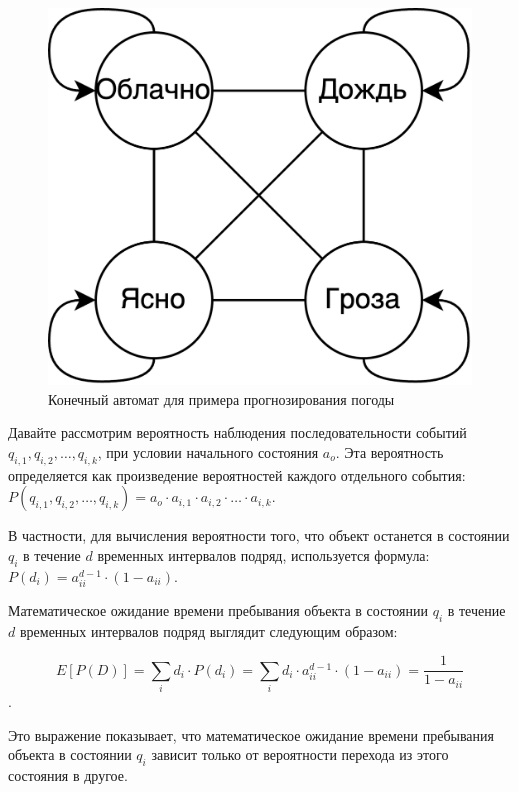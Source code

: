 \begin{figure}[H]
	\begin{center}
		\includegraphics[width=0.40\linewidth]{src/img/1/pogoda_state_machine.png}
		\caption{Конечный автомат для примера прогнозирования погоды}
		\label{fig:pogoda_state_machine}
	\end{center}
\end{figure}

Давайте рассмотрим вероятность наблюдения последовательности событий $q_{i,1}, q_{i,2}, \ldots, q_{i,k}$, при условии начального состояния $a_o$. Эта вероятность определяется как произведение вероятностей каждого отдельного события: $P(q_{i,1}, q_{i,2}, \ldots, q_{i,k}) = a_o \cdot a_{i,1} \cdot a_{i,2} \cdot \ldots \cdot a_{i,k}$.

В частности, для вычисления вероятности того, что объект останется в состоянии $q_i$ в течение $d$ временных интервалов подряд, используется формула: $P(d_i) = a_{ii}^{d-1} \cdot (1 - a_{ii})$.

Математическое ожидание времени пребывания объекта в состоянии $q_i$ в течение $d$ временных интервалов подряд выглядит следующим образом:

$$E[ P(D) ] = \sum\limits_i d_i \cdot P(d_i) = \sum\limits_i d_i \cdot a_{ii}^{d-1} \cdot (1 - a_{ii}) = \dfrac{1}{1 - a_{ii}}$$.

Это выражение показывает, что математическое ожидание времени пребывания объекта в состоянии $q_i$ зависит только от вероятности перехода из этого состояния в другое.

